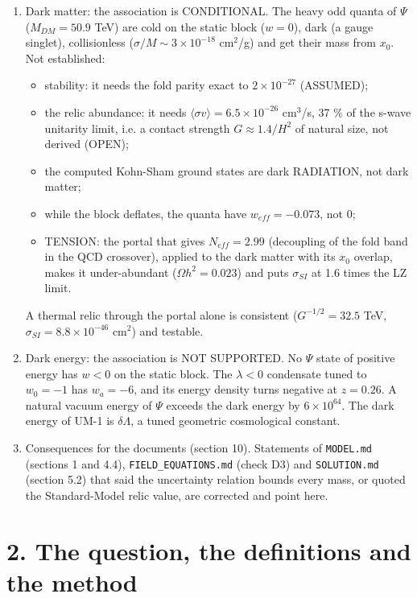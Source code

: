 \documentclass[11pt]{article}
\begin{document}
\begin{enumerate}
\item Dark matter: the association is CONDITIONAL. The heavy odd quanta of $\Psi$ ($M_{DM} = 50.9$ TeV) are cold on the static block ($w = 0$), dark (a gauge singlet), collisionless ($\sigma/M \sim 3\times10^{-18}$ cm$^2$/g) and get their mass from $x_0$. Not established:
\begin{itemize}
\item stability: it needs the fold parity exact to $2\times10^{-27}$ (ASSUMED);
\item the relic abundance: it needs $\langle\sigma v\rangle = 6.5\times10^{-26}$ cm$^3$/s, 37 \% of the s-wave unitarity limit, i.e. a contact strength $G \approx 1.4/H^2$ of natural size, not derived (OPEN);
\item the computed Kohn-Sham ground states are dark RADIATION, not dark matter;
\item while the block deflates, the quanta have $w_{eff} = -0.073$, not 0;
\item TENSION: the portal that gives $N_{eff} = 2.99$ (decoupling of the fold band in the QCD crossover), applied to the dark matter with its $x_0$ overlap, makes it under-abundant ($\Omega h^2 = 0.023$) and puts $\sigma_{SI}$ at 1.6 times the LZ limit.
\end{itemize}
A thermal relic through the portal alone is consistent ($G^{-1/2} = 32.5$ TeV,
$\sigma_{SI} = 8.8\times10^{-46}$ cm$^2$) and testable.
\item Dark energy: the association is NOT SUPPORTED. No $\Psi$ state of positive energy has $w < 0$ on the static block. The $\lambda < 0$ condensate tuned to $w_0 = -1$ has $w_a = -6$, and its energy density turns negative at $z = 0.26$. A natural vacuum energy of $\Psi$ exceeds the dark energy by $6\times10^{64}$. The dark energy of UM-1 is $\delta\Lambda$, a tuned geometric cosmological constant.
\item Consequences for the documents (section 10). Statements of \texttt{MODEL.\allowbreak{}md} (sections 1 and 4.4), \texttt{FIELD\_\allowbreak{}EQUATIONS.\allowbreak{}md} (check D3) and \texttt{SOLUTION.\allowbreak{}md} (section 5.2) that said the uncertainty relation bounds every mass, or quoted the Standard-Model relic value, are corrected and point here.
\end{enumerate}

\section*{2. The question, the definitions and the method}
\end{document}
